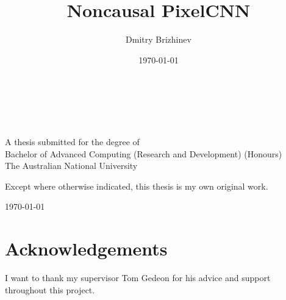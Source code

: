\documentclass[11pt, a4paper, openany]{book}
\title{Noncausal PixelCNN}
\author{Dmitry Brizhinev}
\date{\today}
\begin{document}
\pagestyle{empty}
\thispagestyle{empty}

\begin{titlepage}
  \enlargethispage{2cm}
  \begin{center}
    \makeatletter
    \Huge\textbf{\@title} \\[.4cm]
    \Huge\textbf{\thesisqualifier} \\[2.5cm]
    \huge\textbf{\@author} \\[9cm]
    \makeatother
    \LARGE A thesis submitted for the degree of \\
    Bachelor of Advanced Computing (Research and Development) (Honours) \\
    The Australian National University \\[2cm]
    \thismonth
  \end{center}
\end{titlepage}


\vspace*{7cm}
\begin{center}
  Except where otherwise indicated, this thesis is my own original
  work.
\end{center}

\vspace*{4cm}

\hspace{8cm}\makeatletter\@author\makeatother\par
\hspace{8cm}\today

\cleardoublepage
\pagestyle{empty}
\chapter*{Acknowledgements}
I want to thank my supervisor Tom Gedeon for his advice and support throughout this project.


\pagestyle{headings}
\end{document}
